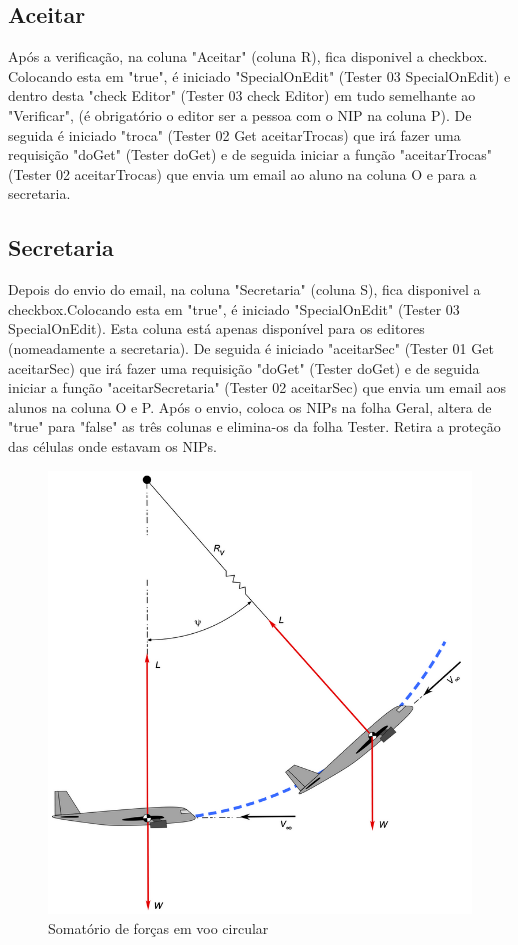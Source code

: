 \subsection{Aceitar}
Após a verificação, na coluna "Aceitar" (coluna R), fica disponivel a checkbox. Colocando esta em "true", é iniciado "SpecialOnEdit" (Tester 03 SpecialOnEdit) e dentro desta "check Editor" (Tester 03 check Editor) em tudo semelhante ao "Verificar", (é obrigatório o editor ser a pessoa com o NIP na coluna P). De seguida é iniciado "troca" (Tester 02 Get aceitarTrocas) que irá fazer uma requisição "doGet" (Tester doGet) e de seguida iniciar a função "aceitarTrocas" (Tester 02 aceitarTrocas) que envia um email ao aluno na coluna O e para a secretaria.

\subsection{Secretaria}
Depois do envio do email, na coluna "Secretaria" (coluna S), fica disponivel a checkbox.Colocando esta em "true", é iniciado "SpecialOnEdit" (Tester 03 SpecialOnEdit). Esta coluna está apenas disponível para os editores (nomeadamente a secretaria). De seguida é iniciado "aceitarSec" (Tester 01 Get aceitarSec) que irá fazer uma requisição "doGet" (Tester doGet) e de seguida iniciar a função "aceitarSecretaria" (Tester 02 aceitarSec) que envia um email aos alunos na coluna O e P. Após o envio, coloca os NIPs na folha Geral, altera de "true" para "false" as três colunas e elimina-os da folha Tester. Retira a proteção das células onde estavam os NIPs.

    
    \begin{figure}[h!]
        \centering
        \includegraphics[width=.33\linewidth]{Imagens/img2_airPull.png}
        \caption{Somatório de forças em voo circular}
        \label{fig:enter-label}
    \end{figure}
    